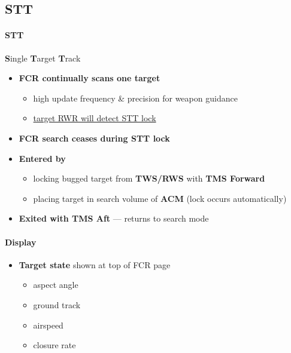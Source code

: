\subsection{STT}
\label{subsec:stt}

\paragraph{STT}
\textbf{S}ingle \textbf{T}arget \textbf{T}rack
\begin{itemize}
    \item \textbf{FCR continually scans one target}
    \begin{itemize}
        \item high update frequency \& precision for weapon guidance
        \item \underline{target RWR will detect STT lock}
    \end{itemize}
    \item \textbf{FCR search ceases during STT lock}
    \item \textbf{Entered by}
    \begin{itemize}
        \item locking bugged target from \textbf{TWS/RWS} with \textbf{TMS Forward}
        \item placing target in search volume of \textbf{ACM} (lock occurs automatically)
    \end{itemize}
    \item \textbf{Exited with TMS Aft} --- returns to search mode
\end{itemize}

\paragraph{Display}
\begin{itemize}
    \item \textbf{Target state} shown at top of FCR page
    \begin{itemize}
        \item aspect angle 
        \item ground track 
        \item airspeed 
        \item closure rate
    \end{itemize}
\end{itemize}

